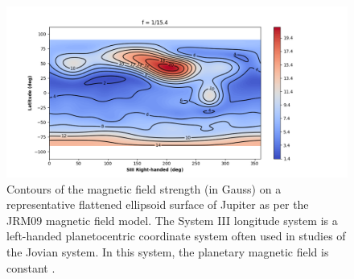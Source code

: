 \begin{figure}
    \centering
    \includegraphics[width=\textwidth]{images5/JRM09_Bmag.png}
    \caption{Contours of the magnetic field strength (in Gauss) on a representative flattened ellipsoid surface of Jupiter as per the JRM09 magnetic field model. The System III longitude system is a left-handed planetocentric coordinate system often used in studies of the Jovian system. In this system, the planetary magnetic field is constant
    \protect\cite{Connerney2018}.}
    \label{fig:JRM09}
\end{figure}

